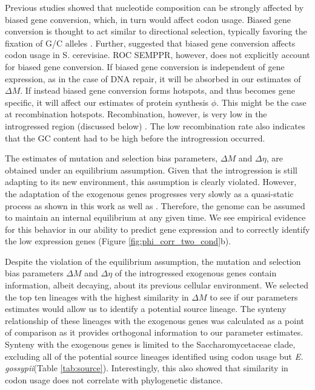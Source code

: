 \documentclass[doublespacing,linenumbers]{bmcart}
\newcommand{\gossypii}{\textit{E. gossypii}\xspace}
\newcommand{\ROC}{ROC SEMPPR\xspace}
\newcommand{\GC}{GC content\xspace}
\newcommand{\DM}{\ensuremath{{\Delta M}}\xspace}
\newcommand{\DE}{\ensuremath{{\Delta \eta}}\xspace}
\begin{document}
Previous studies showed that nucleotide composition can be strongly affected by biased gene conversion, which, in turn would affect codon usage.
Biased gene conversion is thought to act similar to directional selection, typically favoring the fixation of G/C alleles \cite{nagylaki1983a, nagylaki1983b}. 
Further, \cite[Harrison \& Charlesworth]{harrison2011} suggested that biased gene conversion affects codon usage in S. cerevisiae.
\ROC, however, does not explicitly account for biased gene conversion.
If biased gene conversion is independent of gene expression, as in the case of DNA repair, it will be absorbed in our estimates of \DM.
If instead biased gene conversion forms hotspots, and thus becomes gene specific, it will affect our estimates of protein synthesis $\phi$.
This might be the case at recombination hotspots.
Recombination, however, is very low in the introgressed region (discussed below) \cite{payen2009, brion2017}.
The low recombination rate also indicates that the \GC had to be high before the introgression occurred.

The estimates of mutation and selection bias parameters, \DM and \DE, are obtained under an equilibrium assumption.
Given that the introgression is still adapting to its new environment, this assumption is clearly violated.
However, the adaptation of the exogenous genes progresses very slowly as a quasi-static process as shown in this work as well as \cite{friedrich2015}.
Therefore, the genome can be assumed to maintain an internal equilibrium at any given time. 
We see empirical evidence for this behavior in our ability to predict gene expression and to correctly identify the low expression genes (Figure \ref{fig:phi_corr_two_cond}b). 

Despite the violation of the equilibrium assumption, the mutation and selection bias parameters \DM and \DE of the introgressed exogenous genes contain information, albeit decaying, about its previous cellular environment.
We selected the top ten lineages with the highest similarity in \DM to see if our parameters estimates would allow us to identify a potential source lineage.
The synteny relationship of these lineages with the exogenous genes was calculated as a point of comparison as it provides orthogonal information to our parameter estimates.
Synteny with the exogenous genes is limited to the Saccharomycetaceae clade, excluding all of the potential source lineages identified using codon usage but \gossypii (Table \ref{tab:source}).
Interestingly, this also showed that similarity in codon usage does not correlate with phylogenetic distance.
\end{document}
